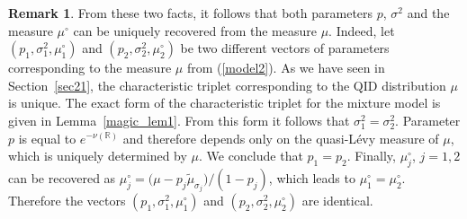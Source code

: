 \documentclass[a4paper,11pt]{article}
\theoremstyle{definition}
\newtheorem{remark}{Remark}
\newcommand{\R}{{\mathbb{R}}}
\newcommand{\1}{\mathbb{I}}
\def\R{\mathbb{R}}
\theoremstyle{remark}
\begin{document}
\begin{remark} \label{rem2a}
From these two facts, it follows that both parameters \(p\), \(\sigma^2\) and the measure \(\mu^\circ\) can be uniquely recovered from the measure \(\mu\). Indeed, let \((p_1, \sigma_1^2, \mu^\circ_1)\) and \((p_2, \sigma_2^2, \mu^\circ_2)\) be two different vectors of parameters corresponding to the measure $\mu$ from (\ref{model2}). %
    As we have seen in Section~\ref{sec21}, the characteristic triplet corresponding to the QID distribution $\mu$ is unique. The exact form of the characteristic triplet for the mixture model is given in Lemma~\ref{magic_lem1}. From this form it follows that $\sigma^2_1 = \sigma^2_2$. Parameter $p$ is equal to \(e^{-\nu(\R)}\) and therefore depends only on the quasi-L{\'e}vy measure of $\mu$, which is uniquely determined by $\mu$. We conclude that  $p_1 = p_2$. Finally,  \(\mu_j^\circ\), $j = 1, 2$ can be recovered as \(\mu_j^\circ = \bigl( \mu - p_j  \tilde\mu_{\sigma_j} \bigr)/(1-p_j)\), which leads to $\mu_1^\circ = \mu_2^\circ$. Therefore the vectors \((p_1, \sigma_1^2, \mu^\circ_1)\) and \((p_2, \sigma_2^2, \mu^\circ_2)\) are identical.




\end{remark}%
\end{document}
